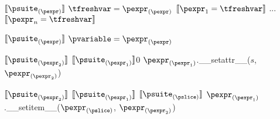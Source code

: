 \documentclass{article}
\begin{document}
\begin{mathpar}
\end{mathpar}

\newsavebox{\multipleAssignmentBox}
\begin{lrbox}{\multipleAssignmentBox}
\begin{python}
$\meaningof{\psuite_{(\pexpr)}}$
$\tfreshvar = \pexpr_{(\pexpr)}$
$\meaningof{\pexpr_1 = \tfreshvar}$
...
$\meaningof{\pexpr_n = \tfreshvar}$
\end{python}
\end{lrbox}

\begin{mathpar}
\end{mathpar}

\newsavebox{\variableAssignmentBox}
\begin{lrbox}{\variableAssignmentBox}
\begin{python}
$\meaningof{\psuite_{(\pexpr)}}$
$\pvariable = \pexpr_{(\pexpr)}$
\end{python}
\end{lrbox}

\begin{mathpar}
\end{mathpar}

\newsavebox{\attributeAssignmentBox}
\begin{lrbox}{\attributeAssignmentBox}
\begin{python}
$\meaningof{\psuite_{(\pexpr_2)}}$
$\meaningof{\psuite_{(\pexpr_1)}}$0
$\pexpr_{(\pexpr_1)}$.__setattr__($s$, $\pexpr_{(\pexpr_2)}$)
\end{python}
\end{lrbox}

\begin{mathpar}
\end{mathpar}

\newsavebox{\sliceAssignmentBox}
\begin{lrbox}{\sliceAssignmentBox}
\begin{python}
$\meaningof{\psuite_{(\pexpr_2)}}$
$\meaningof{\psuite_{(\pexpr_1)}}$
$\meaningof{\psuite_{(\pslice)}}$
$\pexpr_{(\pexpr_1)}$.__setitem__($\pexpr_{(\pslice)}$, $\pexpr_{(\pexpr_2)}$)
\end{python}
\end{lrbox}
\end{document}
